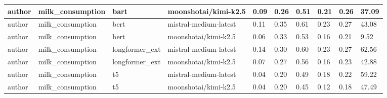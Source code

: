 \begin{tabular}{|l|l|l|l|l|l|l|l|l|l|}
 \hline
 author & milk\_consumption & bart & moonshotai/kimi-k2.5 & 0.09 & 0.26 & 0.51 & 0.21 & 0.26 & 37.09 \\
 \hline
 author & milk\_consumption & bert & mistral-medium-latest & 0.11 & 0.35 & 0.61 & 0.23 & 0.27 & 43.08 \\
 \hline
 author & milk\_consumption & bert & moonshotai/kimi-k2.5 & 0.06 & 0.33 & 0.53 & 0.16 & 0.21 & 9.52 \\
 \hline
 author & milk\_consumption & longformer\_ext & mistral-medium-latest & 0.14 & 0.30 & 0.60 & 0.23 & 0.27 & 62.56 \\
 \hline
 author & milk\_consumption & longformer\_ext & moonshotai/kimi-k2.5 & 0.07 & 0.27 & 0.56 & 0.16 & 0.23 & 42.88 \\
 \hline
 author & milk\_consumption & t5 & mistral-medium-latest & 0.04 & 0.20 & 0.49 & 0.18 & 0.22 & 59.22 \\
 \hline
 author & milk\_consumption & t5 & moonshotai/kimi-k2.5 & 0.04 & 0.20 & 0.45 & 0.12 & 0.18 & 47.49 \\
\hline
\end{tabular}
